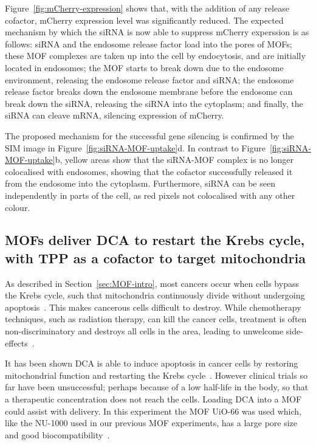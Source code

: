 Figure~\ref{fig:mCherry-expression} shows that, with the addition of any release cofactor, mCherry expression level was significantly reduced. 
The expected mechanism by which the siRNA is now able to suppress mCherry experssion is as follows: siRNA and the endosome release factor load into the pores of MOFs; these MOF complexes are taken up into the cell by endocytosis, and are initially located in endosomes; the MOF starts to break down due to the endosome environment, releasing the endosome release factor and siRNA; the endosome release factor breaks down the endosome membrane before the endosome can break down the siRNA, releasing the siRNA into the cytoplasm; and finally, the siRNA can cleave mRNA, silencing expression of mCherry.

The proposed mechanism for the successful gene silencing is confirmed by the SIM image in Figure~\ref{fig:siRNA-MOF-uptake}d. 
In contrast to Figure~\ref{fig:siRNA-MOF-uptake}b, yellow areas show that the siRNA-MOF complex is no longer colocalised with endosomes, showing that the cofactor successfully released it from the endosome into the cytoplasm. 
Furthermore, siRNA can be seen independently in parts of the cell, as red pixels not colocalised with any other colour. 

\subsection{MOFs deliver DCA to restart the Krebs cycle, with TPP as a cofactor to target mitochondria}
As described in Section~\ref{sec:MOF-intro}, most cancers occur when cells bypass the Krebs cycle, such that mitochondria continuously divide without undergoing apoptosis~\cite{murray1993cell}.
This makes cancerous cells difficult to destroy. 
While chemotherapy techniques, such as radiation therapy, can kill the cancer cells, treatment is often non-discriminatory and destroys all cells in the area, leading to unwelcome side-effects~\cite{coates1983receiving, de1997patient, minami2010cardiovascular}. 

It has been shown DCA is able to induce apoptosis in cancer cells by restoring mitochondrial function and restarting the Krebs cycle~\cite{bonnet2007mitochondria}. 
However clinical trials so far have been unsuccessful; perhaps because of a low half-life in the body, so that a therapeutic concentration does not reach the cells. 
Loading DCA into a MOF could assist with delivery. 
In this experiment the MOF UiO-66 was used which, like the NU-1000 used in our previous MOF experiments, has a large pore size and good biocompatibility~\cite{abanades2018mechanistic}. 

